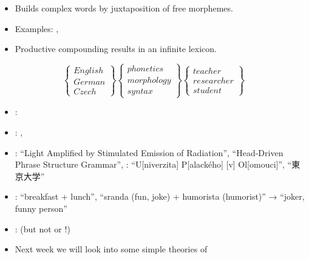 \documentclass[a4paper,landscape,headrule,footrule]{foils}
\begin{document}
  \begin{itemize}
    \item Builds complex words by juxtaposition of free morphemes.
    \item Examples: , \eng{[dish]+[washer]}
    \item Productive compounding results in an infinite lexicon.
  \end{itemize}
  \medskip
  \[
    \left\{\begin{array}{l}
        English \\
        German \\
        Czech
      \end{array}
      \right\}
    \left\{\begin{array}{l}
        phonetics \\
        morphology \\
        syntax
      \end{array}
      \right\}
    \left\{\begin{array}{l}
        teacher \\
        researcher \\
        student
      \end{array}
      \right\}
  \]
 


\begin{itemize}
\item {}: 
\item {}: , 
\item {}:  ``Light Amplified by Stimulated Emission of Radiation'',  ``Head-Driven Phrase Structure Grammar'', : ``U[niverzita] P[alackého] [v] Ol[omouci]'',  ``東京大学''
\item {}:  ``breakfast + lunch'',  ``sranda (fun, joke) + humorista (humorist)'' → ``joker, funny person''
\item {}:  (but not  or !)
\end{itemize}
  

\begin{itemize}
\item Next week we will look into some simple theories of 
\end{itemize}
  
\end{document}
